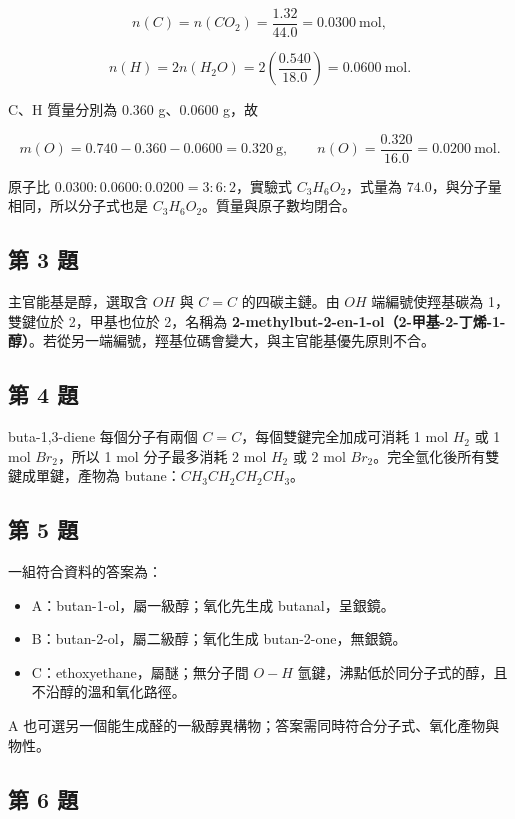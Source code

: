 \documentclass[11pt,a4paper]{article}
\providecommand{\tightlist}{%
  \setlength{\itemsep}{0pt}\setlength{\parskip}{0pt}}
\begin{document}
\[
n(C)=n(CO_2)=\frac{1.32}{44.0}=0.0300\ \mathrm{mol},
\]

\[
n(H)=2n(H_2O)=2\left(\frac{0.540}{18.0}\right)=0.0600\ \mathrm{mol}.
\]

C、H 質量分別為 \(0.360\) g、\(0.0600\) g，故

\[
m(O)=0.740-0.360-0.0600=0.320\ \mathrm g,\qquad
n(O)=\frac{0.320}{16.0}=0.0200\ \mathrm{mol}.
\]

原子比 \(0.0300:0.0600:0.0200=3:6:2\)，實驗式 \(C_3H_6O_2\)，式量為 \(74.0\)，與分子量相同，所以分子式也是 \(C_3H_6O_2\)。質量與原子數均閉合。

\subsection{第 3 題}\label{ux7b2c-3-ux984c}

主官能基是醇，選取含 \(OH\) 與 \(C=C\) 的四碳主鏈。由 \(OH\) 端編號使羥基碳為 1，雙鍵位於 2，甲基也位於 2，名稱為 \textbf{2-methylbut-2-en-1-ol（2-甲基-2-丁烯-1-醇）}。若從另一端編號，羥基位碼會變大，與主官能基優先原則不合。

\subsection{第 4 題}\label{ux7b2c-4-ux984c}

buta-1,3-diene 每個分子有兩個 \(C=C\)，每個雙鍵完全加成可消耗 1 mol \(H_2\) 或 1 mol \(Br_2\)，所以 1 mol 分子最多消耗 2 mol \(H_2\) 或 2 mol \(Br_2\)。完全氫化後所有雙鍵成單鍵，產物為 butane：\(CH_3CH_2CH_2CH_3\)。

\subsection{第 5 題}\label{ux7b2c-5-ux984c}

一組符合資料的答案為：

\begin{itemize}
\tightlist
\item
  A：butan-1-ol，屬一級醇；氧化先生成 butanal，呈銀鏡。
\item
  B：butan-2-ol，屬二級醇；氧化生成 butan-2-one，無銀鏡。
\item
  C：ethoxyethane，屬醚；無分子間 \(O-H\) 氫鍵，沸點低於同分子式的醇，且不沿醇的溫和氧化路徑。
\end{itemize}

A 也可選另一個能生成醛的一級醇異構物；答案需同時符合分子式、氧化產物與物性。

\subsection{第 6 題}\label{ux7b2c-6-ux984c}
\end{document}
